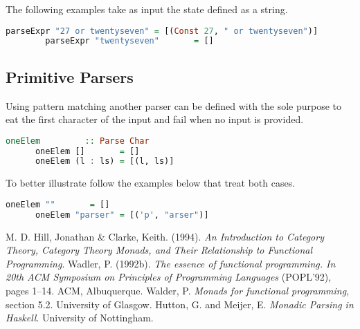 \documentclass[a4paper, onecolumn]{article}
\begin{document}
    The following examples take as input the state defined as a string. 
    
    \begin{lstlisting}[language=Haskell]
        parseExpr "27 or twentyseven" = [(Const 27, " or twentyseven")] 
        parseExpr "twentyseven"       = []
    \end{lstlisting}
    
    \subsection{Primitive Parsers}
    
    Using pattern matching another parser can be defined with the sole purpose to eat the first character of the input and fail when no input is provided. 
    
    \begin{tcolorbox}
      \begin{lstlisting}[language=Haskell]
      oneElem         :: Parse Char
      oneElem []       = []
      oneElem (l : ls) = [(l, ls)]
     \end{lstlisting}
    \end{tcolorbox}
    
    To better illustrate follow the examples below that treat both cases.
    
      \begin{lstlisting}[language=Haskell]
      oneElem ""       = []
      oneElem "parser" = [('p', "arser")]
     \end{lstlisting}
    
    
    \begin{thebibliography}{9}
    M. D. Hill, Jonathan & Clarke, Keith. (1994). \textit{An Introduction to Category Theory, Category Theory Monads, and Their Relationship to Functional Programming}.
    Wadler, P. (1992b). \textit{The essence of functional programming. In
    20th ACM Symposium on Principles of Programming Languages}
    (POPL’92), pages 1–14. ACM, Albuquerque.
    Walder, P. \textit{Monads for functional programming}, section 5.2. University of Glasgow. 
    Hutton, G. and Meijer, E. \textit{Monadic Parsing in Haskell}. University of Nottingham.
    \end{thebibliography}
    
\end{document}
